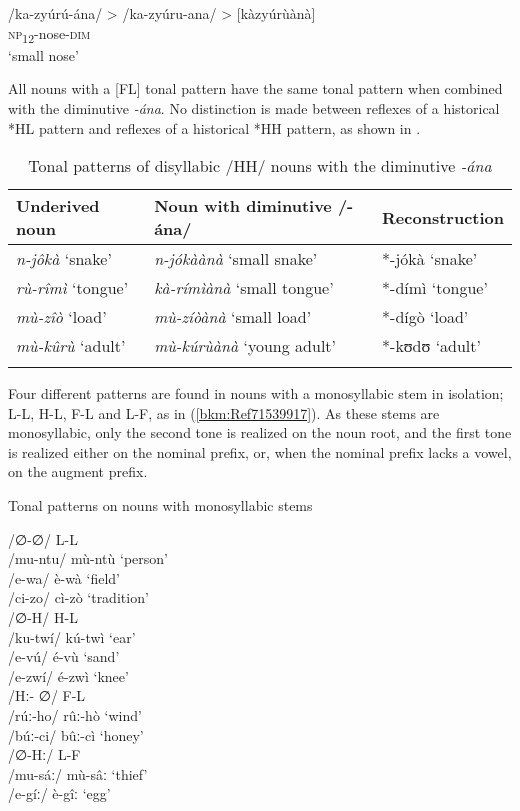 \ea
\label{bkm:Ref98929804}
\gll /ka-zyúrú-ána/ > /ka-zyúru-ana/ > [kàzyúrùànà]\\
\textsc{np}\textsubscript{12}-nose-\textsc{dim}\\
\glt ‘small nose’
\z

All nouns with a [FL] tonal pattern have the same tonal pattern when combined with the dimin\-utive \textit{-ána}. No distinction is made between reflexes of a historical *HL pat\-tern and reflexes of a historical *HH pattern, as shown in .

\begin{table}
\label{bkm:Ref98512572}\caption{\label{tab:3:3}Tonal patterns of disyllabic /HH/ nouns with the diminutive \textit{-ána}}

\begin{tabular}{lll}

\lsptoprule

Underived noun & Noun with diminutive /-ána/ & Reconstruction\\
\midrule 
\textit{n-jôkà} ‘snake’ & \textit{n-jókàànà} ‘small snake’ & *-jókà ‘snake’\\
\textit{rù-rîmì} ‘tongue’ & \textit{kà-rímìànà} ‘small tongue’ & *-dímì ‘tongue’\\
\textit{mù-zîò} ‘load’ & \textit{mù-zíòànà} ‘small load’ & *-dígò ‘load’\\
\textit{mù-kûrù} ‘adult’ & \textit{mù-kúrùànà} ‘young adult’ & *-kʊdʊ ‘adult’\\
\lspbottomrule
\end{tabular}
\end{table}

Four different patterns are found in nouns with a monosyllabic stem in isolation; L-L, H-L, F-L and L-F, as in (\ref{bkm:Ref71539917}). As these stems are monosyllabic, only the second tone is realized on the noun root, and the first tone is realized either on the nominal prefix, or, when the nominal prefix lacks a vowel, on the augment prefix.

\ea
\label{bkm:Ref71539917}
  Tonal patterns on nouns with monosyllabic stems

\ea
/∅-∅/ \tab L-L \tab \\
/mu-ntu/ \tab mù-ntù \tab ‘person’\\
/e-wa/ \tab è-wà \tab ‘field’\\
/ci-zo/ \tab cì-zò \tab ‘tradition’\\
\ex
/∅-H/ \tab H-L \tab \\
/ku-twí/ \tab kú-twì \tab ‘ear’\\
/e-vú/ \tab é-vù \tab ‘sand’\\
/e-zwí/ \tab é-zwì \tab ‘knee’\\
\ex
/Hː- ∅/ \tab F-L \tab \\
/rúː-ho/ \tab rûː-hò \tab ‘wind’\\
/búː-ci/ \tab bûː-cì \tab ‘honey’\\
\ex
/∅-Hː/ \tab L-F \tab \\
/mu-sáː/ \tab mù-sâː \tab ‘thief’\\
/e-gíː/ \tab è-gîː \tab ‘egg’\\
\z
\z

